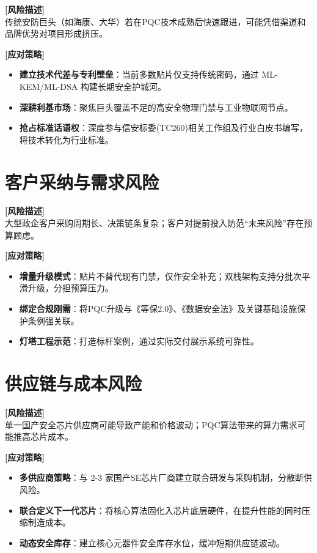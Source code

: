 \textbf{[风险描述]} \\
传统安防巨头（如海康、大华）若在PQC技术成熟后快速跟进，可能凭借渠道和品牌优势对项目形成挤压。

\textbf{[应对策略]}
\begin{itemize}
	\item \textbf{建立技术代差与专利壁垒}：当前多数贴片仅支持传统密码，通过 ML-KEM/ML-DSA 构建长期安全护城河。
	\item \textbf{深耕利基市场}：聚焦巨头覆盖不足的高安全物理门禁与工业物联网节点。
	\item \textbf{抢占标准话语权}：深度参与信安标委(TC260)相关工作组及行业白皮书编写，将技术转化为行业标准。
\end{itemize}

\section{客户采纳与需求风险}

\textbf{[风险描述]} \\
大型政企客户采购周期长、决策链条复杂；客户对提前投入防范“未来风险”存在预算顾虑。

\textbf{[应对策略]}
\begin{itemize}
	\item \textbf{增量升级模式}：贴片不替代现有门禁，仅作安全补充；双栈架构支持分批次平滑升级，分担预算压力。
	\item \textbf{绑定合规刚需}：将PQC升级与《等保2.0》、《数据安全法》及关键基础设施保护条例强关联。
	\item \textbf{灯塔工程示范}：打造标杆案例，通过实际交付展示系统可靠性。
\end{itemize}

\section{供应链与成本风险}

\textbf{[风险描述]} \\
单一国产安全芯片供应商可能导致产能和价格波动；PQC算法带来的算力需求可能推高芯片成本。

\textbf{[应对策略]}
\begin{itemize}
	\item \textbf{多供应商策略}：与 2-3 家国产SE芯片厂商建立联合研发与采购机制，分散断供风险。
	\item \textbf{联合定义下一代芯片}：将核心算法固化入芯片底层硬件，在提升性能的同时压缩制造成本。
	\item \textbf{动态安全库存}：建立核心元器件安全库存水位，缓冲短期供应链波动。
\end{itemize}

